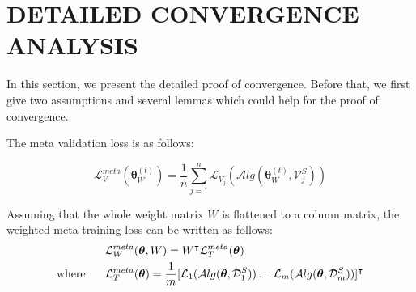 


\section{DETAILED CONVERGENCE ANALYSIS}
\label{app:conRate}
In this section, we present the detailed proof of convergence. Before that, we first give two assumptions and several lemmas which could help for the proof of convergence.

The meta validation loss is as follows: 

$$\mathcal{L}_{V}^{meta}(\boldsymbol{\theta}^{(t)}_{W}) = \frac{1}{n}\sum_{j=1}^{n}\mathcal{L}_{V_j}(\mathcal{A}lg(\boldsymbol{\theta}^{(t)}_{W},\mathcal{V}_j^{S}))$$

Assuming that the whole weight matrix $W$ is flattened to a column matrix, the weighted meta-training loss can be written as follows:
\begin{align*}
    &\mathcal{L}_{W}^{meta}(\boldsymbol{\theta}, W) = {W}^{\intercal} \mathcal{L}_{T}^{meta}(\boldsymbol{\theta})\\
    \text{where \hspace{0.5cm}}&{\mathcal{L}}_{T}^{meta}(\boldsymbol{\theta}) = \frac{1}{m}[\mathcal{L}_{1}(\mathcal{A}lg(\boldsymbol{\theta},\mathcal{D}_1^{S})) \dots \mathcal{L}_{m}(\mathcal{A}lg(\boldsymbol{\theta},\mathcal{D}_m^{S}))]^{\intercal}
\end{align*}

